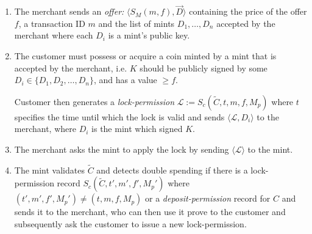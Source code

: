 \documentclass{llncs}
\begin{document}
\begin{enumerate}
\item\label{offer2} The merchant sends an \emph{offer:} $\langle S_M(m, f),
  \vec{D} \rangle$ containing the price of the offer $f$, a transaction
  ID $m$ and the list of mints $D_1, \ldots, D_n$ accepted by the merchant
  where each $D_i$ is a mint's public key.
\item\label{lock2} The customer must possess or acquire a coin minted by a mint that is
  accepted by the merchant, i.e. $K$ should be publicly signed by some $D_i
  \in \{D_1, D_2, \ldots, D_n\}$, and has a value $\geq f$.

  Customer then generates a \emph{lock-permission} $\mathcal{L} :=
  S_c(\widetilde{C}, t, m, f, M_p)$ where $t$ specifies the time until which the
  lock is valid and sends $\langle \mathcal{L}, D_i\rangle$ to the merchant,
  where $D_i$ is the mint which signed $K$.
\item The merchant asks the mint to apply the lock by sending $\langle
  \mathcal{L} \rangle$ to the mint.
\item The mint validates $\widetilde{C}$ and detects double spending if there is
  a lock-permission record $S_c(\widetilde{C}, t', m', f', M_p')$ where $(t',
  m', f', M_p') \neq (t, m, f, M_p)$ or a \emph{deposit-permission} record for
  $C$ and sends it to the merchant, who can then use it prove to the customer
  and subsequently ask the customer to issue a new lock-permission.


\end{enumerate}
\end{document}
